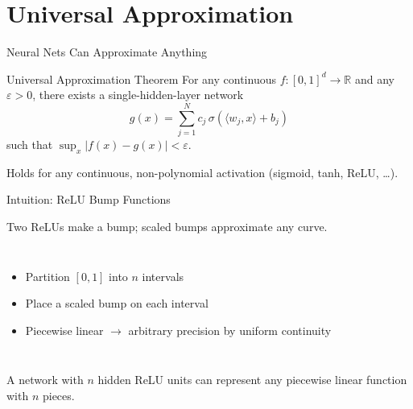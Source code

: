 \documentclass[aspectratio=169, professionalfonts]{beamer}
\def\R{\mathbb{R}}
\begin{document}
\section{Universal Approximation}

\begin{frame}{Neural Nets Can Approximate Anything}

\begin{block}{Universal Approximation Theorem}
For any continuous $f:[0,1]^d\to\R$ and any $\varepsilon>0$,
there exists a single-hidden-layer network
$$g(x) = \sum_{j=1}^{N} c_j\,\sigma(\langle w_j, x\rangle + b_j)$$
such that $\sup_x |f(x) - g(x)| < \varepsilon$.
\end{block}

\bigskip

Holds for any continuous, non-polynomial activation
(sigmoid, tanh, ReLU, \ldots).

\end{frame}

\begin{frame}{Intuition: ReLU Bump Functions}

Two ReLUs make a bump; scaled bumps approximate any curve.

\begin{columns}[c]


\begin{itemize}
  \item Partition $[0,1]$ into $n$ intervals
  \item Place a scaled bump on each interval
  \item Piecewise linear $\to$ arbitrary precision
        by uniform continuity
\end{itemize}
\end{columns}

\bigskip

A network with $n$ hidden ReLU units can represent any
piecewise linear function with $n$ pieces.

\end{frame}
\end{document}
